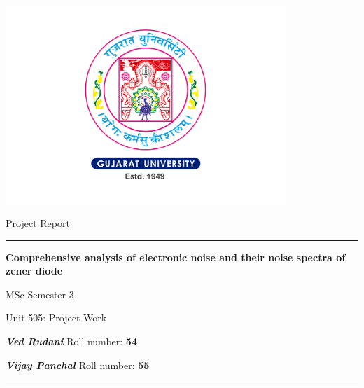 



\parbox[h]{.95\textwidth}{\centering
\parbox[h]{.75\textwidth}{\centering\includegraphics[width=300pt]{GUlogo.pdf}}
    \parbox[b]{.75\textwidth}{\centering\Huge Project Report \par}\vskip10pt
    \parbox[b]{.75\textwidth}{\centering\hrule\vskip50pt\Huge\textbf{Comprehensive analysis of electronic noise and their noise spectra of zener diode}\par}\vskip50pt
   \parbox[b]{.75\textwidth}{\centering \LARGE MSc Semester $3$}\vskip7pt
    \parbox[b]{.75\textwidth}{\centering \large Unit 505:  Project Work}\vskip30pt 

    \parbox[b]{.75\textwidth}{\centering\normalsize \textbf{\emph{Ved Rudani}}   Roll number: \textbf{54}\par}\vskip2pt
    \parbox[b]{.75\textwidth}{\centering\normalsize \textbf{\emph{Vijay Panchal}}  Roll number: \textbf{55}\par \vskip50pt\hrule{}}\vskip10pt
   }

